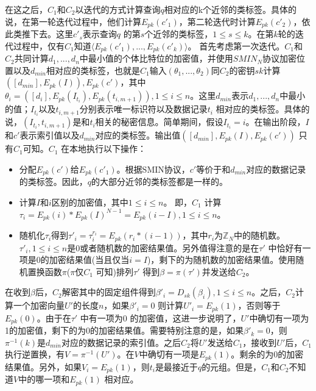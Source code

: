 在这之后，$C_1$和$C_2$以迭代的方式计算查询$q$相对应的k个近邻的类标签。具体的说，在第一轮迭代过程中，他们计算$E_{pk}(c'_1)$，第二轮迭代时计算$E_{pk}(c'_2)$，依此类推下去。这里$c'_s$表示查询$q$ 的第$s$个近邻的类标签，$1 \leq s \leq k$。在第$k$轮的迭代过程中，仅有$C_1$知道$\langle E_{pk}(c'_1),...,E_{pk}(c'_k)\rangle$。 首先考虑第一次迭代。$C_1$和$C_2$共同计算$d_1,...,d_n$中最小值的个体比特位的加密值，并使用$SMIN_N$协议加密位置以及$d_{min}$相对应的类标签，也就是$C_1$输入$(\theta_1,...,\theta_2)$同$C_2$的密钥$sk$计算$([d_{min}],E_{pk}(I)),E_{pk}(c')$，其中$\theta_i=([d_i],E_{pk}(I_{t_i}),E_{pk}(t_{i,m+1})),1 \leq i \leq n$。这里$d_{min}$表示$d_1,...,d_n$中最小的值；$I_{t_i}$以及$t_{i,m+1}$分别表示唯一标识符以及数据记录$t_i$ 相对应的类标签。具体的说，$(I_{t_i},t_{i,m+1})$是和$t_i$相关的秘密信息。简单期间，假设$I_{t_i}=i$。在输出阶段，$I$和$c'$表示索引值以及$d_{min}$对应的类标签。输出值$([d_{min}],E_{pk}(I),E_{pk}(c'))$ 只有$C_1$可知。$C_1$ 在本地执行以下操作：
\begin{itemize}
\item 分配$E_{pk}(c')$给$E_{pk}(c'_1)$。根据SMIN协议，$c'$等价于和$d_{min}$对应的数据记录的类标签。因此，$q$的大部分近邻的类标签都是一样的。
\item 计算$I$和$i$区别的加密值，其中$1 \leq i \leq n$。 即，$C_1$ 计算$\tau_i = E_{pk}(i)*E_{pk}(I)^{N-1}=E_{pk}(i-I),1 \leq i \leq n$。
\item 随机化$\tau_i$得到$\tau'_i = \tau^{r_i}_i = E_{pk}(r_i *(i-1))$，其中$r_i$为$\mathbb{Z}_N$中的随机数。$\tau'_i,1 \leq i \leq n$是0或者随机数的加密结果值。另外值得注意的是在$\tau'$ 中恰好有一项是0的加密结果值(当且仅当$i=I$)，剩下的为随机数的加密结果值。使用随机置换函数$\pi$($\pi$仅$C_1$ 可知)排列$\tau'$ 得到$\beta=\pi(\tau')$并发送给$C_2$。
\end{itemize}
在收到$\beta$后，$C_2$解密其中的固定组件得到$\beta'_i = D_{sk}(\beta_i),1 \leq i \leq n$。之后，$C_2$计算一个加密向量$U'$的长度$n$，如果$\beta'_i=0$ 则计算$U'_i = E_{pk}(1)$，否则等于$E_{pk}(0)$。由于在$\tau'$ 中有一项为0 的加密值，这进一步说明了，$U'$中确切有一项为1的加密值，剩下的为0的加密结果值。需要特别注意的是，如果$\beta'_k=0$，则$\pi^{-1}(k)$是$d_{min}$对应的数据记录的索引值。之后$C_2$将$U'$发送给$C_1$，接收到$U'$后，$C_1$执行逆置换，有$V=\pi^{-1}(U')$。在$V$中确切有一项是$E_{pk}(1)$。剩余的为0的加密结果值。另外，如果$V_i=E_{pk}(1)$，则$t_i$是最接近于$q$的元组。但是，$C_1$和$C_2$不知道$V$中的哪一项和$E_{pk}(1)$ 相对应。

